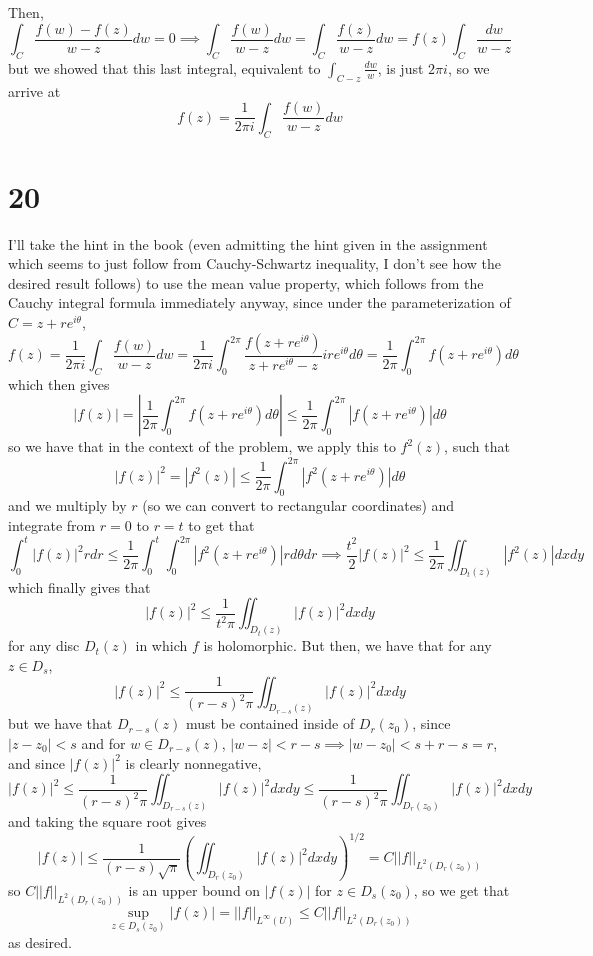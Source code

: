 \documentclass[12pt,letterpaper]{article}
\theoremstyle{definition}
\begin{document}
Then,
\[
  \int_{C}\frac{f(w)-f(z)}{w-z}dw = 0 \implies \int_{C}\frac{f(w)}{w-z}dw = \int_{C}\frac{f(z)}{w-z}dw = f(z)\int_{C}\frac{dw}{w-z}
\]
but we showed that this last integral, equivalent to $\int_{C-z}\frac{dw}{w}$, is just $2\pi i$, so we arrive at
\[
  f(z) = \frac{1}{2\pi i}\int_{C}\frac{f(w)}{w-z}dw
\]


\section*{20}

I'll take the hint in the book (even admitting the hint given in the assignment which seems to just follow from Cauchy-Schwartz inequality, I don't see how the desired result follows) to use the mean value property, which follows from the Cauchy integral formula immediately anyway, since under the parameterization of $C = z + re^{i\theta}$,
\[
  f(z) = \frac{1}{2\pi i}\int_{C}\frac{f(w)}{w-z}dw = \frac{1}{2\pi i}\int_{0}^{2\pi}\frac{f(z + re^{i\theta})}{z+re^{i\theta}-z}ire^{i\theta}d\theta = \frac{1}{2\pi}\int_{0}^{2\pi}f(z+re^{i\theta})d\theta
\]
which then gives
\[
  |f(z)| = \left|\frac{1}{2\pi}\int_{0}^{2\pi}f(z+re^{i\theta})d\theta\right| \leq \frac{1}{2\pi}\int_{0}^{2\pi}|f(z+re^{i\theta})|d\theta
\]
so we have that in the context of the problem, we apply this to $f^{2}(z)$, such that
\[
  |f(z)|^{2} = |f^{2}(z)| \leq \frac{1}{2\pi}\int_{0}^{2\pi}|f^{2}(z+re^{i\theta})|d\theta
\]
and we multiply by $r$ (so we can convert to rectangular coordinates) and integrate from $r = 0$ to $r = t$ to get that
\[
  \int_{0}^{t}|f(z)|^{2}rdr \leq \frac{1}{2\pi}\int_{0}^{t}\int_{0}^{2\pi}|f^{2}(z+re^{i\theta})|rd\theta dr \implies \frac{t^{2}}{2}|f(z)|^{2} \leq \frac{1}{2\pi}\iint_{D_{t}(z)}|f^{2}(z)|dx dy
\]
which finally gives that
\[
  |f(z)|^{2} \leq \frac{1}{t^{2}\pi}\iint_{D_{t}(z)}|f(z)|^{2}dxdy
\]
for any disc $D_{t}(z)$ in which $f$ is holomorphic. But then, we have that for any $z \in D_{s}$,
\[
  |f(z)|^{2} \leq \frac{1}{(r-s)^{2}\pi}\iint_{D_{r-s}(z)}|f(z)|^{2}dxdy
\]
but we have that $D_{r-s}(z)$ must be contained inside of $D_{r}(z_{0})$, since $|z - z_{0}| < s$ and for $w \in D_{r-s}(z)$, $|w - z| < r -s \implies |w - z_{0}| < s + r -s = r$, and since $|f(z)|^{2}$ is clearly nonnegative,
\[
  |f(z)|^{2} \leq \frac{1}{(r-s)^{2}\pi}\iint_{D_{r-s}(z)}|f(z)|^{2}dxdy \leq \frac{1}{(r-s)^{2}\pi}\iint_{D_{r}(z_{0})}|f(z)|^{2}dxdy
\]
and taking the square root gives
\[
  |f(z)| \leq \frac{1}{(r-s)\sqrt{\pi}}\left(\iint_{D_{r}(z_{0})}|f(z)|^{2}dxdy\right)^{1/2} = C||f||_{L^{2}(D_{r}(z_{0}))}
\]
so $C||f||_{L^{2}(D_{r}(z_{0}))}$ is an upper bound on $|f(z)|$ for $z \in D_{s}(z_{0})$, so we get that
\[
  \sup_{z \in D_{s}(z_{0})}|f(z)| = ||f||_{L^{\infty}(U)} \leq C||f||_{L^{2}(D_{r}(z_{0}))}
\]
as desired.
\end{document}
